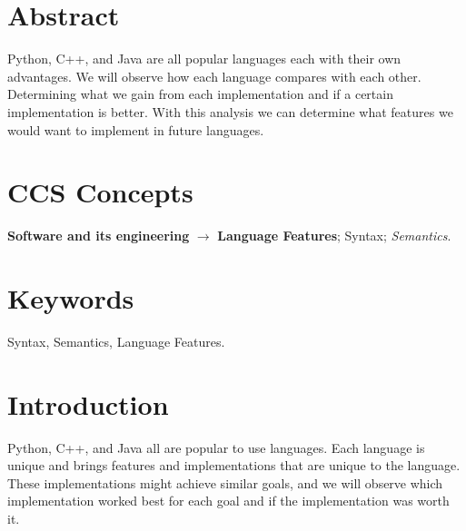 \documentclass[sigconf, nonacm, authorversion, language=english, 12pt]{acmart}
\begin{document}





\PLtitle


\section*{Abstract}
Python, C++, and Java are all popular languages each with their own advantages. We will observe how each
language compares with each other. Determining what we gain from each implementation and if a certain implementation is
better. With this analysis we can determine what features we would want to implement in future languages.\\

\section*{CCS Concepts}
\textbullet\hspace*{0.5mm} \textbf{Software and its engineering} $\rightarrow$ \textbf{Language Features}; Syntax; \textit{Semantics}.\\
\section*{Keywords}
Syntax, Semantics, Language Features.\\
\section{Introduction}
Python, C++, and Java all are popular to use languages.
Each language is unique and brings features and implementations that are unique to the language. These implementations might achieve similar goals,
and we will observe which implementation worked best for each goal and if the implementation was worth it.
\end{document}
